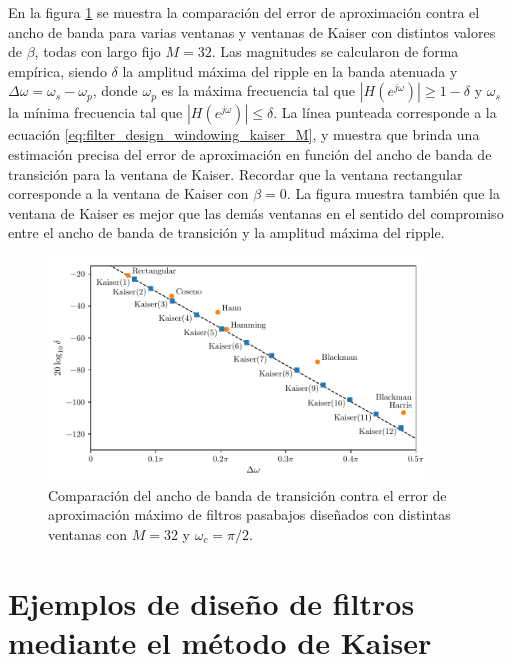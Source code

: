 \documentclass[a4paper]{report}
\begin{document}
En la figura \ref{fig:filter_design_windowing_kaiser_bandwidth_and_ripple} se muestra la comparación del error de aproximación contra el ancho de banda para varias ventanas y ventanas de Kaiser con distintos valores de \(\beta\), todas con largo fijo \(M=32\). Las magnitudes se calcularon de forma empírica, siendo \(\delta\) la amplitud máxima del ripple en la banda atenuada y \(\Delta\omega=\omega_s-\omega_p\), donde \(\omega_p\) es la máxima frecuencia tal que \(|H(e^{j\omega})|\geq1-\delta\) y \(\omega_s\) la mínima frecuencia tal que \(|H(e^{j\omega})|\leq\delta\). La línea punteada corresponde a la ecuación \ref{eq:filter_design_windowing_kaiser_M}, y muestra que brinda una estimación precisa del error de aproximación en función del ancho de banda de transición para la ventana de Kaiser. Recordar que la ventana rectangular corresponde a la ventana de Kaiser con \(\beta=0\). La figura muestra también que la ventana de Kaiser es mejor que las demás ventanas en el sentido del compromiso entre el ancho de banda de transición y la amplitud máxima del ripple.
\begin{figure}[!htb]
 \begin{center}
 \includegraphics[width=0.9\textwidth]{figuras/filter_design_windowing_kaiser_bandwidth_and_ripple.pdf}
 \caption{\label{fig:filter_design_windowing_kaiser_bandwidth_and_ripple} Comparación del ancho de banda de transición contra el error de aproximación máximo de filtros pasabajos diseñados con distintas ventanas con \(M=32\) y \(\omega_c=\pi/2\).}
 \end{center}
\end{figure}

\section{Ejemplos de diseño de filtros mediante el método de Kaiser}
\end{document}
